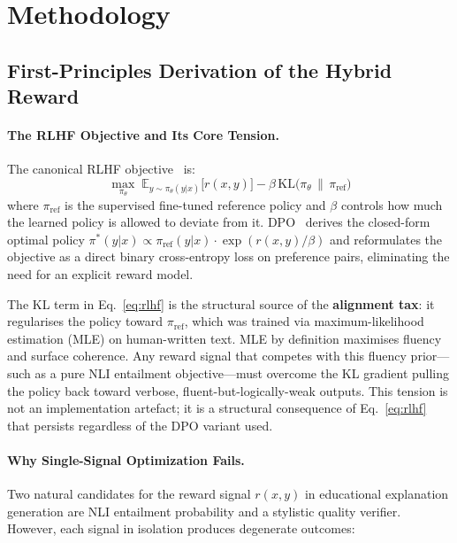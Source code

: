 \section{Methodology}
\label{sec:methodology}

\subsection{First-Principles Derivation of the Hybrid Reward}
\label{sec:first_principles}

\paragraph{The RLHF Objective and Its Core Tension.}
The canonical RLHF objective~\cite{ouyang2022training} is:
\begin{equation}
\max_{\pi_\theta}\; \mathbb{E}_{y \sim \pi_\theta(y|x)}\bigl[r(x,y)\bigr] - \beta\,\text{KL}\bigl(\pi_\theta \,\|\, \pi_\text{ref}\bigr)
\label{eq:rlhf}
\end{equation}
where $\pi_\text{ref}$ is the supervised fine-tuned reference policy and $\beta$ controls how much the learned policy is allowed to deviate from it.
DPO~\cite{rafailov2023direct} derives the closed-form optimal policy
$\pi^*(y|x) \propto \pi_\text{ref}(y|x)\cdot\exp(r(x,y)/\beta)$ and reformulates the objective as a direct binary cross-entropy loss on preference pairs, eliminating the need for an explicit reward model.

The KL term in Eq.~\ref{eq:rlhf} is the structural source of the \textbf{alignment tax}: it regularises the policy toward $\pi_\text{ref}$, which was trained via maximum-likelihood estimation (MLE) on human-written text. MLE by definition maximises fluency and surface coherence. Any reward signal that competes with this fluency prior---such as a pure NLI entailment objective---must overcome the KL gradient pulling the policy back toward verbose, fluent-but-logically-weak outputs.
This tension is not an implementation artefact; it is a structural consequence of Eq.~\ref{eq:rlhf} that persists regardless of the DPO variant used.

\paragraph{Why Single-Signal Optimization Fails.}
Two natural candidates for the reward signal $r(x,y)$ in educational explanation generation are NLI entailment probability and a stylistic quality verifier. However, each signal in isolation produces degenerate outcomes:

